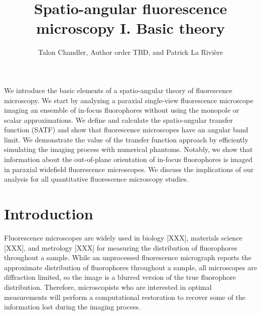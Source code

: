 \documentclass{osa-article}
\begin{document}
\title{Spatio-angular fluorescence microscopy I. Basic theory}

\author{Talon Chandler, Author order TBD, and Patrick La Rivi\`ere }

\address{University of Chicago, Department of Radiology, Chicago, Illinois 60637, USA\\
Publications Department, The Optical Society, 2010 Massachusetts Avenue NW, Washington, DC 20036, USA\\
Currently with the Department of Electronic Journals, The Optical Society, 2010 Massachusetts Avenue NW, Washington, DC 20036, USA}




\begin{abstract*}
  We introduce the basic elements of a spatio-angular theory of fluorescence
  microscopy. We start by analyzing a paraxial single-view fluorescence
  microscope imaging an ensemble of in-focus fluorophores without using the
  monopole or scalar approximations. We define and calculate the spatio-angular
  transfer function (SATF) and show that fluorescence microscopes have an
  angular band limit. We demonstrate the value of the transfer function approach
  by efficiently simulating the imaging process with numerical phantoms.
  Notably, we show that information about the out-of-plane orientation of
  in-focus fluorophores is imaged in paraxial widefield fluorescence
  microscopes. We discuss the implications of our analysis for all quantitative
  fluorescence microscopy studies.
\end{abstract*}

\section{Introduction}
Fluorescence microscopes are widely used in biology [XXX], materials science
[XXX], and metrology [XXX] for measuring the distribution of fluorophores
throughout a sample. While an unprocessed fluorescence micrograph reports the
approximate distribution of fluorophores throughout a sample, all microscopes
are diffraction limited, so the image is a blurred version of the true
fluorophore distribution. Therefore, microscopists who are interested in optimal
measurements will perform a computational restoration to recover some of the
information lost during the imaging process.
\end{document}
